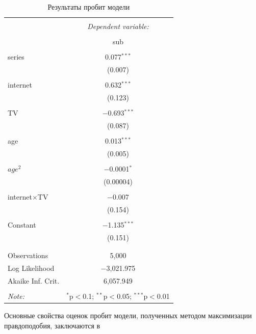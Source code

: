\documentclass[a4paper,12pt]{article}
\begin{document}
	\begin{table}[!h] \centering 
	  \caption{Результаты пробит модели} 
	  \label{probit} 
	  \small
	\begin{tabular}{@{\extracolsep{5pt}}lc} 
	\\[-1.8ex]\hline 
	\hline \\[-1.8ex] 
	 & \multicolumn{1}{c}{\textit{Dependent variable:}} \\ 
	\cline{2-2} 
	\\[-1.8ex] & sub \\ 
	\hline \\[-1.8ex] 
	 series & 0.077$^{***}$ \\ 
	  & (0.007) \\ 
	  & \\ 
	 internet & 0.632$^{***}$ \\ 
	  & (0.123) \\ 
	  & \\ 
	 TV & $-$0.693$^{***}$ \\ 
	  & (0.087) \\ 
	  & \\ 
	 age & 0.013$^{***}$ \\ 
	  & (0.005) \\ 
	  & \\ 
	 $age^2$ & $-$0.0001$^{*}$ \\ 
	  & (0.00004) \\ 
	  & \\ 
	 internet$\times$TV & $-$0.007 \\ 
	  & (0.154) \\ 
	  & \\ 
	 Constant & $-$1.135$^{***}$ \\ 
	  & (0.151) \\ 
	  & \\ 
	\hline \\[-1.8ex] 
	Observations & 5,000 \\ 
	Log Likelihood & $-$3,021.975 \\ 
	Akaike Inf. Crit. & 6,057.949 \\ 
	\hline 
	\hline \\[-1.8ex] 
	\textit{Note:}  & \multicolumn{1}{r}{$^{*}$p$<$0.1; $^{**}$p$<$0.05; $^{***}$p$<$0.01} \\ 
	\end{tabular} 
	\end{table} 

\vspace{0.2cm}
	Основные свойства оценок пробит модели, полученных методом максимизации правдоподобия, заключаются в 
	
\end{document}
